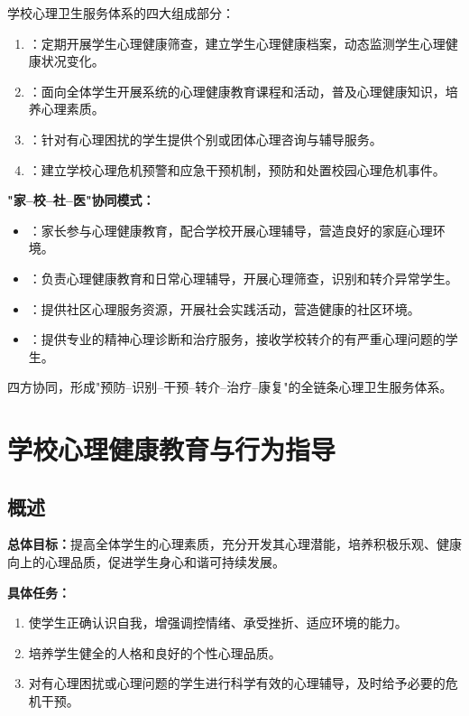 \begin{keybox}
学校心理卫生服务体系的四大组成部分：

\begin{enumerate}[leftmargin=*]
    \item {}：定期开展学生心理健康筛查，建立学生心理健康档案，动态监测学生心理健康状况变化。
    \item {}：面向全体学生开展系统的心理健康教育课程和活动，普及心理健康知识，培养心理素质。
    \item {}：针对有心理困扰的学生提供个别或团体心理咨询与辅导服务。
    \item {}：建立学校心理危机预警和应急干预机制，预防和处置校园心理危机事件。
\end{enumerate}

\textbf{"家--校--社--医"协同模式：}

\begin{itemize}[leftmargin=*]
    \item {}：家长参与心理健康教育，配合学校开展心理辅导，营造良好的家庭心理环境。
    \item {}：负责心理健康教育和日常心理辅导，开展心理筛查，识别和转介异常学生。
    \item {}：提供社区心理服务资源，开展社会实践活动，营造健康的社区环境。
    \item {}：提供专业的精神心理诊断和治疗服务，接收学校转介的有严重心理问题的学生。
\end{itemize}

四方协同，形成"预防--识别--干预--转介--治疗--康复"的全链条心理卫生服务体系。
\end{keybox}

\section{学校心理健康教育与行为指导}

\subsection{概述}

\begin{defbox}\textbf{总体目标：}提高全体学生的心理素质，充分开发其心理潜能，培养积极乐观、健康向上的心理品质，促进学生身心和谐可持续发展。

\textbf{具体任务：}
\begin{enumerate}[leftmargin=*]
    \item 使学生正确认识自我，增强调控情绪、承受挫折、适应环境的能力。
    \item 培养学生健全的人格和良好的个性心理品质。
    \item 对有心理困扰或心理问题的学生进行科学有效的心理辅导，及时给予必要的危机干预。
\end{enumerate}
\end{defbox}

